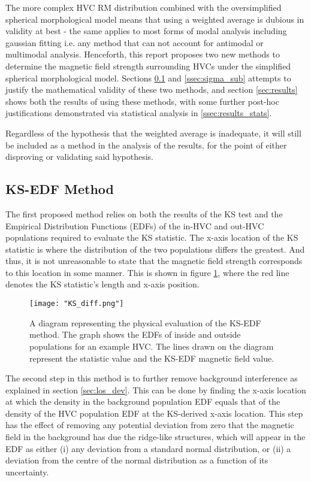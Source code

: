 The more complex HVC RM distribution combined with the oversimplified spherical morphological model means that using a weighted average is dubious in validity at best - the same applies to most forms of modal analysis including gaussian fitting i.e. any method that can not account for antimodal or multimodal analysis. Henceforth, this report proposes two new methods to determine the magnetic field strength surrounding HVCs under the simplified spherical morphological model. Sections \ref{ssec:KS_EDF} and \ref{ssec:sigma_sub} attempts to justify the mathematical validity of these two methods, and section \ref{sec:results} shows both the results of using these methods, with some further post-hoc justifications demonstrated via statistical analysis in \ref{ssec:results_stats}.


Regardless of the hypothesis that the weighted average is inadequate, it will still be included as a method in the analysis of the results, for the point of either disproving or validating said hypothesis.


\subsection{KS-EDF Method}
\label{ssec:KS_EDF}

The first proposed method relies on both the results of the KS test and the Empirical Distribution Functions (EDFs) of the in-HVC and out-HVC populations required to evaluate the KS statistic. The x-axis location of the KS statistic is where the distribution of the two populations differs the greatest. And thus, it is not unreasonable to state that the magnetic field strength corresponds to this location in some manner. This is shown in figure \ref{fig:KSdiff}, where the red line denotes the KS statistic's length and x-axis position.


\begin{figure}
    \texttt{[image: "KS\_diff.png"]}
    \centering
    \caption{A diagram representing the physical evaluation of the KS-EDF method. The graph shows the EDFs of inside and outside populations for an example HVC. The lines drawn on the diagram represent the statistic value and the KS-EDF magnetic field value.}
    \label{fig:KSdiff}
\end{figure}

The second step in this method is to further remove background interference as explained in section \ref{sec:los_dev}. This can be done by finding the x-axis location at which the density in the background population EDF equals that of the density of the HVC population EDF at the KS-derived x-axis location. This step has the effect of removing any potential deviation from zero that the magnetic field in the background has due the ridge-like structures, which will appear in the EDF as either (i) any deviation from a standard normal distribution, or (ii) a deviation from the centre of the normal distribution as a function of its uncertainty.


